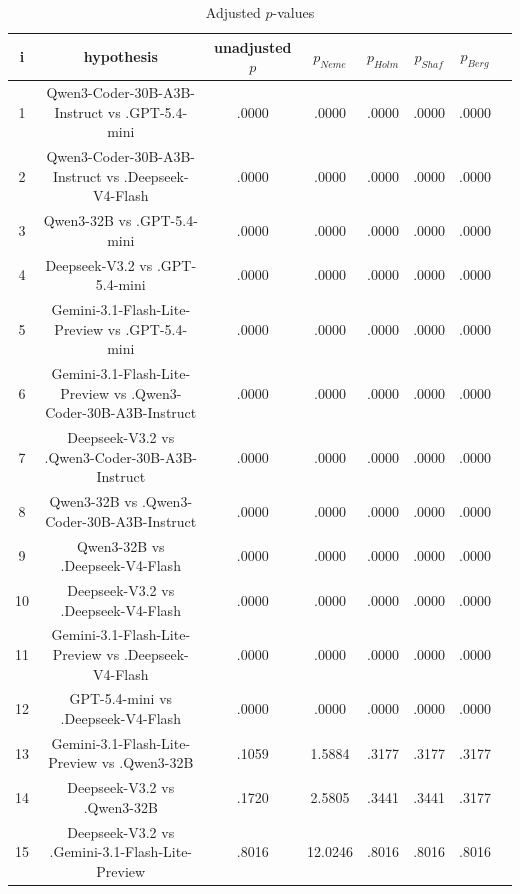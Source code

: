 \documentclass[a4paper,10pt]{article}
\begin{document}
\begin{landscape}
\begin{table}[!htp]
\centering\tiny
\caption{Adjusted $p$-values}
\begin{tabular}{cccccccc}
i&hypothesis&unadjusted $p$&$p_{Neme}$&$p_{Holm}$&$p_{Shaf}$&$p_{Berg}$\\
\hline
1&Qwen3-Coder-30B-A3B-Instruct vs .GPT-5.4-mini&.0000&.0000&.0000&.0000&.0000\\2&Qwen3-Coder-30B-A3B-Instruct vs .Deepseek-V4-Flash&.0000&.0000&.0000&.0000&.0000\\3&Qwen3-32B vs .GPT-5.4-mini&.0000&.0000&.0000&.0000&.0000\\4&Deepseek-V3.2 vs .GPT-5.4-mini&.0000&.0000&.0000&.0000&.0000\\5&Gemini-3.1-Flash-Lite-Preview vs .GPT-5.4-mini&.0000&.0000&.0000&.0000&.0000\\6&Gemini-3.1-Flash-Lite-Preview vs .Qwen3-Coder-30B-A3B-Instruct&.0000&.0000&.0000&.0000&.0000\\7&Deepseek-V3.2 vs .Qwen3-Coder-30B-A3B-Instruct&.0000&.0000&.0000&.0000&.0000\\8&Qwen3-32B vs .Qwen3-Coder-30B-A3B-Instruct&.0000&.0000&.0000&.0000&.0000\\9&Qwen3-32B vs .Deepseek-V4-Flash&.0000&.0000&.0000&.0000&.0000\\10&Deepseek-V3.2 vs .Deepseek-V4-Flash&.0000&.0000&.0000&.0000&.0000\\11&Gemini-3.1-Flash-Lite-Preview vs .Deepseek-V4-Flash&.0000&.0000&.0000&.0000&.0000\\12&GPT-5.4-mini vs .Deepseek-V4-Flash&.0000&.0000&.0000&.0000&.0000\\13&Gemini-3.1-Flash-Lite-Preview vs .Qwen3-32B&.1059&1.5884&.3177&.3177&.3177\\14&Deepseek-V3.2 vs .Qwen3-32B&.1720&2.5805&.3441&.3441&.3177\\15&Deepseek-V3.2 vs .Gemini-3.1-Flash-Lite-Preview&.8016&12.0246&.8016&.8016&.8016\\\hline
\end{tabular}
\end{table}

\end{landscape}
\end{document}
